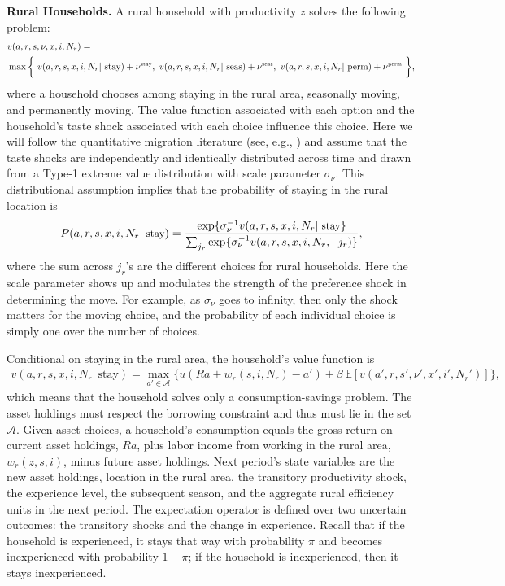 \documentclass[12pt,pdftex]{article}
\begin{document}
\textbf{Rural Households.} A rural household with productivity $z$ solves the following problem:
\begin{align}
\small
 & v(a, r, s, \nu, x, i, N_r) = \nonumber \\
 & \max \bigg\{ \ v(a, r,  s,  x, i, N_r| \ \mbox{stay}) + \nu^{\tiny\mbox{stay}},  \ v(a, r, s, x, i, N_r | \ \mbox{seas}) + \nu^{\tiny\mbox{seas}},\  v(a, r, s, x, i, N_r | \ \mbox{perm})+ \nu^{\tiny\mbox{perm}} \ \bigg \},
\label{eq:value_fun_rural}
\end{align}
where a household chooses among staying in the rural area, seasonally moving, and permanently moving. The value function associated with each option and the household's taste shock associated with each choice influence this choice. Here we will follow the quantitative migration literature (see, e.g., \citet{cadv19}) and assume that the taste shocks are independently and identically distributed across time and drawn from a Type-1 extreme value distribution with scale parameter $\sigma_{\nu}$. This distributional assumption implies that the probability of staying in the rural location is
\begin{eqnarray*}
\small
P(a, r, s, x, i, N_r| \ \mbox{stay}) = \frac{\exp\{\sigma_{\nu}^{-1} v(a, r,  s, x, i, N_r | \ \mbox{stay}\}}{\sum_{j_r} \exp\{\sigma_{\nu}^{-1} v(a, r,  s, x, i, N_r, | \ j_r)\}},
\end{eqnarray*}
where the sum across $j_r$'s are the different choices for rural households. Here the scale parameter shows up and modulates the strength of the preference shock in determining the move. For example, as $\sigma_{\nu}$ goes to infinity, then only the shock matters for the moving choice, and the probability of each individual choice is simply one over the number of choices.

Conditional on staying in the rural area, the household's value function is
\begin{align}
v(a, r, s, x, i, N_r | \ \mbox{stay}) =  \max_{a'\in \mathcal{A}}\bigg  \{ u(Ra + w_{r}(s, i, N_r) - a' )  + \beta \, \mathbb{E} [v(a',r, s',\nu', x',i',N_r')]  \bigg\},
\label{eq:bellman_rural_stay}
\end{align}
which means that the household solves only a consumption-savings problem. The asset holdings must respect the borrowing constraint and thus must lie in the set $\mathcal{A}$. Given asset choices, a household's consumption equals the gross return on current asset holdings, $Ra$, plus labor income from working in the rural area, $w_{r}(z, s, i)$, minus future asset holdings. Next period's state variables are the new asset holdings, location in the rural area, the transitory productivity shock, the experience level, the subsequent season, and the aggregate rural efficiency units in the next period. The expectation operator is defined over two uncertain outcomes: the transitory shocks and the change in experience. Recall that if the household is experienced, it stays that way with probability $\pi$ and becomes inexperienced with probability $1-\pi$; if the household is inexperienced, then it stays inexperienced.
\end{document}

